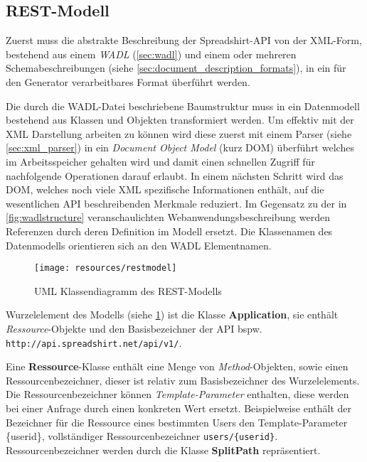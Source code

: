 \subsection{REST-Modell}
\label{sec:rest_model}

Zuerst muss die abstrakte Beschreibung der Spreadshirt-API von der XML-Form, bestehend aus einem \emph{WADL} (\cref{sec:wadl}) und einem oder mehreren Schemabeschreibungen (siehe \cref{sec:document_description_formats}), in ein für den Generator verarbeitbares Format überführt werden.

Die durch die WADL-Datei beschriebene Baumstruktur muss in ein Datenmodell bestehend aus Klassen und Objekten transformiert werden.
Um effektiv mit der XML Darstellung arbeiten zu können wird diese zuerst mit einem Parser (siehe \cref{sec:xml_parser}) in ein \emph{Document Object Model} (kurz DOM) überführt welches im Arbeitsspeicher gehalten wird und damit einen schnellen Zugriff für nachfolgende Operationen darauf erlaubt. In einem nächsten Schritt wird das DOM, welches noch viele XML spezifische Informationen enthält, auf die wesentlichen API beschreibenden Merkmale reduziert. Im Gegensatz zu der in \cref{fig:wadlstructure} veranschaulichten Webanwendungsbeschreibung werden Referenzen durch deren Definition im Modell ersetzt. Die Klassenamen des Datenmodells orientieren sich an den WADL Elementnamen.

\begin{figure}[tb]
    \centering
    \texttt{[image: resources/restmodel]}
    \caption{UML Klassendiagramm des REST-Modells}
    \label{fig:restmodel}
\end{figure}

Wurzelelement des Modells (siehe \cref{fig:restmodel}) ist die Klasse \textbf{Application}, sie enthält \emph{Ressource}-Objekte und den Basisbezeichner der API bspw. \texttt{\small http://api.spreadshirt.net/api/v1/}. 

Eine \textbf{Ressource}-Klasse enthält eine Menge von \emph{Method}-Objekten, sowie einen Ressourcenbezeichner, dieser ist relativ zum Basisbezeichner des Wurzelelements. Die Ressourcenbezeichner können \emph{Template-Parameter} enthalten, diese werden bei einer Anfrage durch einen konkreten Wert ersetzt. Beispielweise enthält der Bezeichner für die Ressource eines bestimmten Users den Template-Parameter \{userid\}, vollständiger Ressourcenbezeichner \texttt{users/\{userid\}}. Ressourcenbezeichner werden durch die Klasse \textbf{SplitPath} repräsentiert. 

